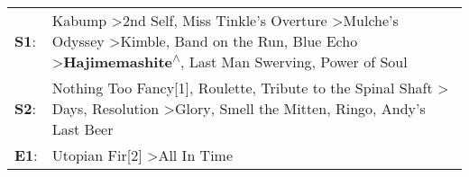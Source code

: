 \begin{supertabular}{p{0.03\textwidth}p{0.92\textwidth}}
 \textbf{S1}:  &  Kabump\textsuperscript{} \textgreater \enspace 2nd Self\textsuperscript{}, \enspace Miss Tinkle's Overture\textsuperscript{} \textgreater \enspace Mulche's Odyssey\textsuperscript{} \textgreater \enspace Kimble\textsuperscript{}, \enspace Band on the Run\textsuperscript{}, \enspace Blue Echo\textsuperscript{} \textgreater \enspace \textbf{Hajimemashite\textsuperscript{$\wedge$}}, \enspace Last Man Swerving\textsuperscript{}, \enspace Power of Soul\textsuperscript{}  \enspace  \\
 \textbf{S2}:  &                                                                                   Nothing Too Fancy[1]\textsuperscript{}, \enspace Roulette\textsuperscript{}, \enspace Tribute to the Spinal Shaft\textsuperscript{} \textgreater {} Days\textsuperscript{}, \enspace Resolution\textsuperscript{} \textgreater \enspace Glory\textsuperscript{}, \enspace Smell the Mitten\textsuperscript{}, \enspace Ringo\textsuperscript{}, \enspace Andy's Last Beer\textsuperscript{}  \enspace  \\
 \textbf{E1}:  &                                                                                                                                                                                                                                                                                                                                                                                                   Utopian Fir[2]\textsuperscript{} \textgreater \enspace All In Time\textsuperscript{}  \enspace  \\
\end{supertabular}
